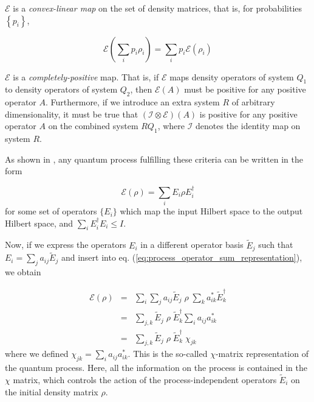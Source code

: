 \begin{axiom}
$\mathcal{E}$ is a {\it convex-linear map} on the set of density matrices, that is, for probabilities $\left\{p_i\right\}$,

  \begin{equation}
	  \mathcal{E}\left(\sum\limits_i p_i \rho_i\right) = \sum\limits_i p_i \mathcal{E}(\rho_i)
	\end{equation}
\end{axiom}

\begin{axiom}
$\mathcal{E}$ is a {\it completely-positive} map. That is, if $\mathcal{E}$  maps density operators of system $Q_1$ to density operators of system $Q_2$, then $\mathcal{E}(A)$ must be positive for any positive operator $A$. Furthermore, if we introduce an extra system $R$ of arbitrary dimensionality, it must be true that $(\mathcal{I}\otimes \mathcal{E})(A)$ is positive for any positive operator $A$ on the combined system $RQ_1$, where $\mathcal{I}$ denotes the identity map on system $R$.
\end{axiom}
As shown in \cite{michael_a._nielsen_quantum_2000}, any quantum process fulfilling these criteria can be written in the form

\begin{equation}
  \mathcal{E}(\rho) = \sum\limits_i E_i \rho E_i^\dagger \label{eq:process_operator_sum_representation}
\end{equation}
for some set of operators $\{ E_i \}$ which map the input Hilbert space to the output Hilbert space, and $\sum_i E_i^\dagger E_i \le I$.

Now, if we express the operators $E_i$ in a different operator basis $\tilde{E}_j$ such that $E_i = \sum_j a_{ij} \tilde{E}_{j}$ and insert into eq. (\ref{eq:process_operator_sum_representation}), we obtain

\begin{eqnarray}
 \mathcal{E}(\rho) & = & \sum\limits_i \sum\limits_j a_{ij} \tilde{E}_j \;\rho\; \sum\limits_k a_{ik}^* \tilde{E}_k^\dagger \\
& = & \sum\limits_{j,k}\tilde{E}_j \; \rho \; \tilde{E}_k^\dagger \sum\limits_i a_{ij} a_{ik}^* \\
& = & \sum\limits_{j,k}\tilde{E}_j \; \rho \; \tilde{E}_k^\dagger \; \chi_{jk} \label{eq:process_chi_representation}
\end{eqnarray}
where we defined $\chi_{jk} = \sum\limits_i a_{ij} a_{ik}^*$. This is the so-called $\chi$-matrix representation of the quantum process. Here, all the information on the process is contained in the $\chi$ matrix, which controls the action of the process-independent operators $\tilde{E}_i$ on the initial density matrix $\rho$.

